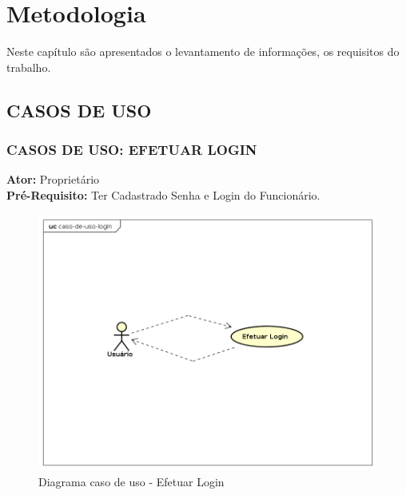 \chapter{Metodologia}
Neste capítulo são apresentados o levantamento de informações, os requisitos do trabalho.

\section{CASOS DE USO}
\subsection{CASOS DE USO: EFETUAR LOGIN}
\begin{flushleft}
\textbf{Ator:}  Proprietário
\\
\textbf{Pré-Requisito:} Ter Cadastrado Senha e Login do Funcionário.
\end{flushleft}

\begin{figure}[htb]
	\caption{\label{fig_login} Diagrama caso de uso - Efetuar Login}
	\begin{center}
	    \includegraphics[width=0.7\linewidth]{imagens/caso-de-uso-login.png}
	\end{center}
\end{figure}

\newpage

